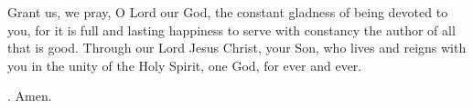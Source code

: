 \lettrine[lines=3]{G}{}rant us, we pray, O Lord our God, the constant gladness of being devoted to you, for it is full and lasting happiness to serve with constancy the author of all that is good. Through our Lord Jesus Christ, your Son, who lives and reigns with you in the unity of the Holy Spirit, one God, for ever and ever. \par \Rbar. Amen.